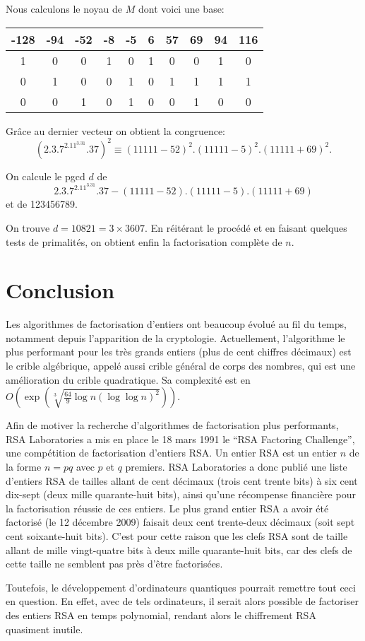\documentclass[french, 12pt, titlepage]{article}
\begin{document}
  Nous calculons le noyau de $M$ dont voici une base:
  \begin{center}
    \begin{tabular}{cccccccccc}
      -128 & -94 & -52 & -8 & -5 & 6 & 57 & 69 & 94 & 116\\
      \hline
      1 & 0 & 0 & 1 & 0 & 1 & 0 & 0 & 1 & 0\\
      0 & 1 & 0 & 0 & 1 & 0 & 1 & 1 & 1 & 1\\
      0 & 0 & 1 & 0 & 1 & 0 & 0 & 1 & 0 & 0\\
    \end{tabular}
  \end{center}

  Grâce au dernier vecteur on obtient la congruence:
  \[ (2.3.7^2.11^3.31.37)^2 \equiv (11111 - 52)^2.(11111 - 5)^2.(11111 + 69)^2.\]

  On calcule le pgcd $d$ de \[ 2.3.7^2.11^3.31.37 - (11111 - 52).(11111 - 5).(11111 + 69)\] et de 123456789.

  
  On trouve $d = 10821 = 3\times 3607.$ En réitérant le procédé et en faisant quelques tests de primalités, on obtient enfin la factorisation complète de $n.$
\section{Conclusion}

Les algorithmes de factorisation d'entiers ont beaucoup évolué au fil du temps, notamment depuis l'apparition de la cryptologie.
Actuellement, l'algorithme le plus performant pour les très grands entiers (plus de cent chiffres décimaux) est le crible algébrique, appelé aussi crible général de corps des nombres,
qui est une amélioration du crible quadratique.
Sa complexité est en $O(\exp(\sqrt[3]{\frac{64}{9}\log n (\log \log n)^2})).$

Afin de motiver la recherche d'algorithmes de factorisation plus performants, RSA Laboratories a mis en place le 18 mars 1991 le ``RSA Factoring Challenge'', une compétition de factorisation d'entiers RSA.
Un entier RSA est un entier $n$ de la forme $n = pq$ avec $p$ et $q$ premiers.
RSA Laboratories a donc publié une liste d'entiers RSA de tailles allant de cent décimaux (trois cent trente bits) à six cent dix-sept (deux mille quarante-huit bits),
ainsi qu'une récompense financière pour la factorisation réussie de ces entiers.
Le plus grand entier RSA a avoir été factorisé (le 12 décembre 2009) faisait deux cent trente-deux décimaux (soit sept cent soixante-huit bits).
C'est pour cette raison que les clefs RSA sont de taille allant de mille vingt-quatre bits à deux mille quarante-huit bits, car des clefs de cette taille ne semblent pas près d'être factorisées.

Toutefois, le développement d'ordinateurs quantiques pourrait remettre tout ceci en question. En effet, avec de tels ordinateurs, il serait alors possible de factoriser des entiers RSA en temps polynomial,
rendant alors le chiffrement RSA quasiment inutile.
\end{document}
